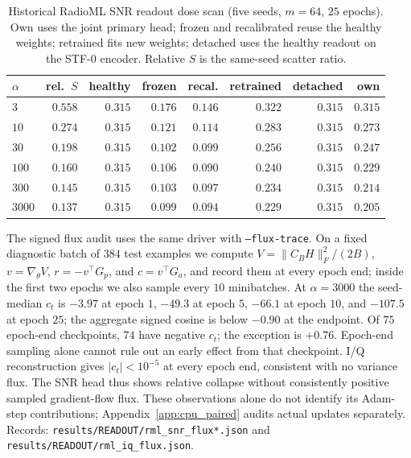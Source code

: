\documentclass{article}
\begin{document}
\begin{table}[h]
\centering
\caption{Historical RadioML SNR readout dose scan (five seeds, $m=64$, $25$ epochs). Own uses the joint primary head; frozen and recalibrated reuse the healthy weights; retrained fits new weights; detached uses the healthy readout on the STF-0 encoder. Relative $S$ is the same-seed scatter ratio.}
\label{tab:readout_dose}
\footnotesize
\begin{tabular}{lrrrrrrr}
\toprule
$\alpha$ & rel.\ $S$ & healthy & frozen & recal. & retrained & detached & own \\
\midrule
$3$ & $0.558$ & $0.315$ & $0.176$ & $0.146$ & $0.322$ & $0.315$ & $0.315$ \\
$10$ & $0.274$ & $0.315$ & $0.121$ & $0.114$ & $0.283$ & $0.315$ & $0.273$ \\
$30$ & $0.198$ & $0.315$ & $0.102$ & $0.099$ & $0.256$ & $0.315$ & $0.247$ \\
$100$ & $0.160$ & $0.315$ & $0.106$ & $0.090$ & $0.240$ & $0.315$ & $0.229$ \\
$300$ & $0.145$ & $0.315$ & $0.103$ & $0.097$ & $0.234$ & $0.315$ & $0.214$ \\
$3000$ & $0.137$ & $0.315$ & $0.099$ & $0.094$ & $0.229$ & $0.315$ & $0.205$ \\
\bottomrule
\end{tabular}
\end{table}

The signed flux audit uses the same driver with \texttt{--flux-trace}. On a fixed diagnostic batch of $384$ test examples we compute $V=\|C_BH\|_F^2/(2B)$, $v=\nabla_\theta V$, $r=-v^\top G_p$, and $c=v^\top G_a$, and record them at every epoch end; inside the first two epochs we also sample every $10$ minibatches. At $\alpha=3000$ the seed-median $c_t$ is $-3.97$ at epoch $1$, $-49.3$ at epoch $5$, $-66.1$ at epoch $10$, and $-107.5$ at epoch $25$; the aggregate signed cosine is below $-0.90$ at the endpoint. Of $75$ epoch-end checkpoints, $74$ have negative $c_t$; the exception is $+0.76$. Epoch-end sampling alone cannot rule out an early effect from that checkpoint. I/Q reconstruction gives $|c_t|<10^{-5}$ at every epoch end, consistent with no variance flux. The SNR head thus shows relative collapse without consistently positive sampled gradient-flow flux. These observations alone do not identify its Adam-step contributions; Appendix~\ref{app:cpu_paired} audits actual updates separately. Records: \texttt{results/READOUT/rml\_snr\_flux*.json} and \texttt{results/READOUT/rml\_iq\_flux.json}.
\end{document}
